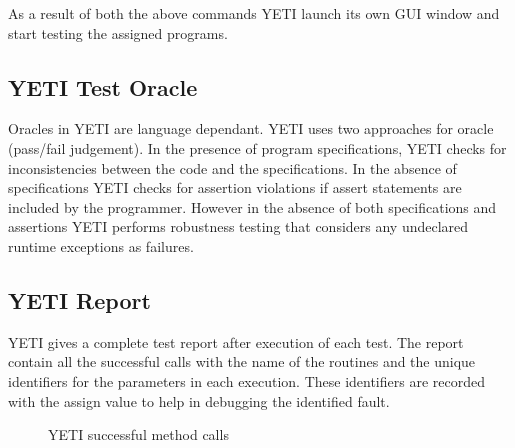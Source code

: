 As a result of both the above commands YETI launch its own GUI window and start testing the assigned programs. 

\subsection{YETI Test Oracle}
Oracles in YETI are language dependant. YETI uses two approaches for oracle (pass/fail judgement). In the presence of program specifications, YETI checks for inconsistencies between the code and the specifications. In the absence of specifications YETI checks for assertion violations if assert statements are included by the programmer. However in the absence of both specifications and assertions YETI performs robustness testing that considers any undeclared runtime exceptions as failures. 


\subsection{YETI Report}
YETI gives a complete test report after execution of each test. The report contain all the successful calls with the name of the routines and the unique identifiers for the parameters in each execution. These identifiers are recorded with the assign value to help in debugging the identified fault. 
\begin{figure}[h]
	\centering
	\caption{YETI successful method calls}
\end{figure}

